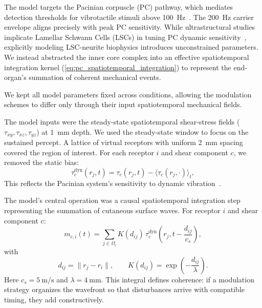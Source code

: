 \documentclass[pdflatex, sn-nature]{sn-jnl}
\theoremstyle{thmstyleone}%
\theoremstyle{thmstyletwo}%
\theoremstyle{thmstylethree}%
\begin{document}
The model targets the Pacinian corpuscle (PC) pathway, which mediates detection thresholds for vibrotactile stimuli above \qty{100}{\hertz}~\citep{johnsonRolesFunctionsCutaneous2001, handlerMechanosensoryNeuronsTouch2021}. The \qty{200}{\hertz} carrier envelope aligns precisely with peak PC sensitivity. While ultrastructural studies implicate Lamellar Schwann Cells (LSCs) in tuning PC dynamic sensitivity~\citep{ziolkowskiInnerCoreEnables2025}, explicitly modeling LSC-neurite biophysics introduces unconstrained parameters. We instead abstracted the inner core complex into an effective spatiotemporal integration kernel (\cref{eq:pc_spatiotemporal_integration}) to represent the end-organ's summation of coherent mechanical events.

We kept all model parameters fixed across conditions, allowing the modulation schemes to differ only through their input spatiotemporal mechanical fields.

The model inputs were the steady-state spatiotemporal shear-stress fields ($\tau_{xy}, \tau_{xz}, \tau_{yz}$) at \qty{1}{\milli\meter} depth. We used the steady-state window to focus on the sustained percept. A lattice of virtual receptors with uniform \qty{2}{\milli\meter} spacing covered the region of interest. For each receptor $i$ and shear component $c$, we removed the static bias:
\begin{equation}
    \tau^{\mathrm{dyn}}_{c}(r_j,t)=\tau_{c}(r_j,t)-\langle \tau_{c}(r_j,\cdot)\rangle_t,
\end{equation}
This reflects the Pacinian system's sensitivity to dynamic vibration~\citep{johanssonTactileSensoryCoding1983, johnsonRolesFunctionsCutaneous2001, handlerMechanosensoryNeuronsTouch2021}.

The model's central operation was a causal spatiotemporal integration step representing the summation of cutaneous surface waves. For receptor $i$ and shear component $c$:
\begin{equation}\label{eq:pc_spatiotemporal_integration}
    m_{c,i}(t)=\sum_{j \in \Omega_i} K(d_{ij})\,\tau^{\mathrm{dyn}}_{c}\!\left(r_j, t-\frac{d_{ij}}{c_s}\right),
\end{equation}
with
\begin{equation}
    d_{ij}=\lVert r_j-r_i \rVert,
    \qquad
    K(d_{ij})=\exp\!\left(-\frac{d_{ij}}{\lambda}\right).
\end{equation}
Here $c_s=\qty{5}{\meter\per\second}$ and $\lambda=\qty{4}{\milli\meter}$. This integral defines coherence: if a modulation strategy organizes the wavefront so that disturbances arrive with compatible timing, they add constructively.
\end{document}
